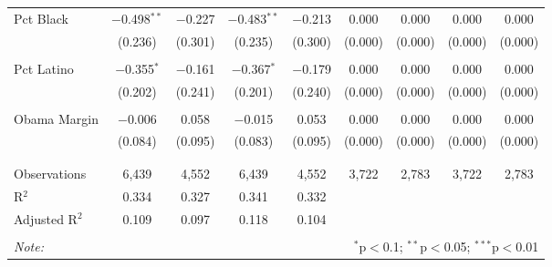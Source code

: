\begin{table}[p]
\begin{tabular}{@{\extracolsep{1pt}}lcccccccc}
 Pct Black & $-$0.498$^{**}$ & $-$0.227 & $-$0.483$^{**}$ & $-$0.213 & 0.000 & 0.000 & 0.000 & 0.000 \\ 
  & (0.236) & (0.301) & (0.235) & (0.300) & (0.000) & (0.000) & (0.000) & (0.000) \\ 
  & & & & & & & & \\ 
 Pct Latino & $-$0.355$^{*}$ & $-$0.161 & $-$0.367$^{*}$ & $-$0.179 & 0.000 & 0.000 & 0.000 & 0.000 \\ 
  & (0.202) & (0.241) & (0.201) & (0.240) & (0.000) & (0.000) & (0.000) & (0.000) \\ 
  & & & & & & & & \\ 
 Obama Margin & $-$0.006 & 0.058 & $-$0.015 & 0.053 & 0.000 & 0.000 & 0.000 & 0.000 \\ 
  & (0.084) & (0.095) & (0.083) & (0.095) & (0.000) & (0.000) & (0.000) & (0.000) \\ 
  & & & & & & & & \\ 
\hline \\[-1.8ex] 
Observations & 6,439 & 4,552 & 6,439 & 4,552 & 3,722 & 2,783 & 3,722 & 2,783 \\ 
R$^{2}$ & 0.334 & 0.327 & 0.341 & 0.332 &  &  &  &  \\ 
Adjusted R$^{2}$ & 0.109 & 0.097 & 0.118 & 0.104 &  &  &  &  \\ 
\hline 
\hline \\[-1.8ex] 
\textit{Note:}  & \multicolumn{8}{r}{$^{*}$p$<$0.1; $^{**}$p$<$0.05; $^{***}$p$<$0.01} \\ 
\end{tabular} 
\end{table} 
